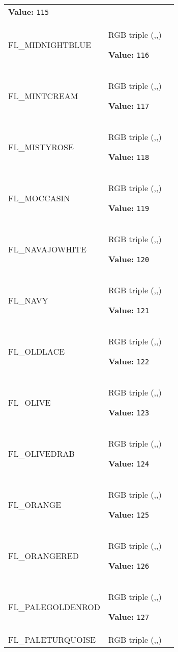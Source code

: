 \begin{longtable}{|p{\varnamewidth}|p{\vardescrwidth}|l}
\textbf{Value:} 
{\tt 115}&\\
\cline{1-2}
\raggedright F\-L\-\_\-M\-I\-D\-N\-I\-G\-H\-T\-B\-L\-U\-E\- & \raggedright RGB triple (,,)

\textbf{Value:} 
{\tt 116}&\\
\cline{1-2}
\raggedright F\-L\-\_\-M\-I\-N\-T\-C\-R\-E\-A\-M\- & \raggedright RGB triple (,,)

\textbf{Value:} 
{\tt 117}&\\
\cline{1-2}
\raggedright F\-L\-\_\-M\-I\-S\-T\-Y\-R\-O\-S\-E\- & \raggedright RGB triple (,,)

\textbf{Value:} 
{\tt 118}&\\
\cline{1-2}
\raggedright F\-L\-\_\-M\-O\-C\-C\-A\-S\-I\-N\- & \raggedright RGB triple (,,)

\textbf{Value:} 
{\tt 119}&\\
\cline{1-2}
\raggedright F\-L\-\_\-N\-A\-V\-A\-J\-O\-W\-H\-I\-T\-E\- & \raggedright RGB triple (,,)

\textbf{Value:} 
{\tt 120}&\\
\cline{1-2}
\raggedright F\-L\-\_\-N\-A\-V\-Y\- & \raggedright RGB triple (,,)

\textbf{Value:} 
{\tt 121}&\\
\cline{1-2}
\raggedright F\-L\-\_\-O\-L\-D\-L\-A\-C\-E\- & \raggedright RGB triple (,,)

\textbf{Value:} 
{\tt 122}&\\
\cline{1-2}
\raggedright F\-L\-\_\-O\-L\-I\-V\-E\- & \raggedright RGB triple (,,)

\textbf{Value:} 
{\tt 123}&\\
\cline{1-2}
\raggedright F\-L\-\_\-O\-L\-I\-V\-E\-D\-R\-A\-B\- & \raggedright RGB triple (,,)

\textbf{Value:} 
{\tt 124}&\\
\cline{1-2}
\raggedright F\-L\-\_\-O\-R\-A\-N\-G\-E\- & \raggedright RGB triple (,,)

\textbf{Value:} 
{\tt 125}&\\
\cline{1-2}
\raggedright F\-L\-\_\-O\-R\-A\-N\-G\-E\-R\-E\-D\- & \raggedright RGB triple (,,)

\textbf{Value:} 
{\tt 126}&\\
\cline{1-2}
\raggedright F\-L\-\_\-P\-A\-L\-E\-G\-O\-L\-D\-E\-N\-R\-O\-D\- & \raggedright RGB triple (,,)

\textbf{Value:} 
{\tt 127}&\\
\cline{1-2}
\raggedright F\-L\-\_\-P\-A\-L\-E\-T\-U\-R\-Q\-U\-O\-I\-S\-E\- & \raggedright RGB triple (,,)


\end{longtable}
